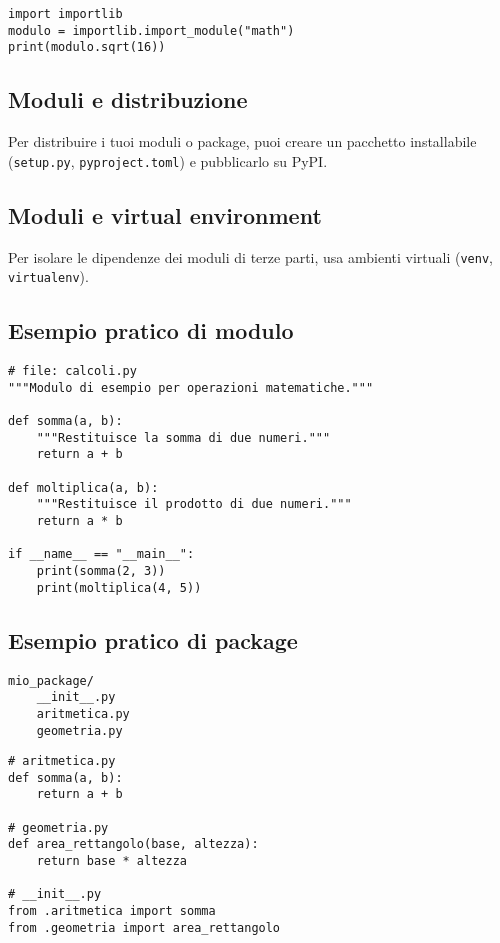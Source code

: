 \documentclass[a4paper,12pt]{article}
\begin{document}
\begin{lstlisting}
import importlib
modulo = importlib.import_module("math")
print(modulo.sqrt(16))
\end{lstlisting}

\subsection*{Moduli e distribuzione}
Per distribuire i tuoi moduli o package, puoi creare un pacchetto installabile (\texttt{setup.py}, \texttt{pyproject.toml}) e pubblicarlo su PyPI.

\subsection*{Moduli e virtual environment}
Per isolare le dipendenze dei moduli di terze parti, usa ambienti virtuali (\texttt{venv}, \texttt{virtualenv}).

\subsection*{Esempio pratico di modulo}
\begin{lstlisting}
# file: calcoli.py
"""Modulo di esempio per operazioni matematiche."""

def somma(a, b):
    """Restituisce la somma di due numeri."""
    return a + b

def moltiplica(a, b):
    """Restituisce il prodotto di due numeri."""
    return a * b

if __name__ == "__main__":
    print(somma(2, 3))
    print(moltiplica(4, 5))
\end{lstlisting}

\subsection*{Esempio pratico di package}
\begin{verbatim}
mio_package/
    __init__.py
    aritmetica.py
    geometria.py
\end{verbatim}

\begin{lstlisting}
# aritmetica.py
def somma(a, b):
    return a + b

# geometria.py
def area_rettangolo(base, altezza):
    return base * altezza

# __init__.py
from .aritmetica import somma
from .geometria import area_rettangolo
\end{lstlisting}
\end{document}
